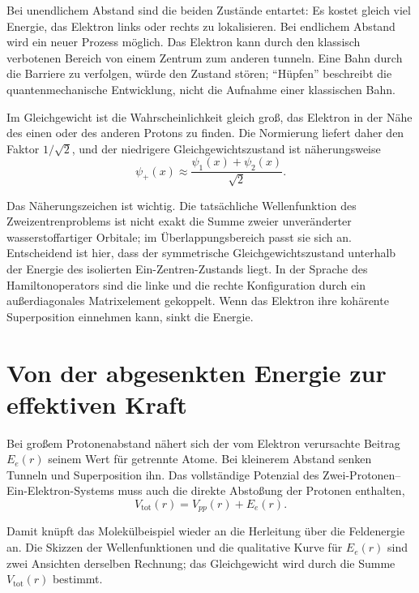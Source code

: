 Bei unendlichem Abstand sind die beiden Zustände entartet: Es kostet gleich viel Energie, das Elektron links oder rechts zu lokalisieren. Bei endlichem Abstand wird ein neuer Prozess möglich. Das Elektron kann durch den klassisch verbotenen Bereich von einem Zentrum zum anderen tunneln. Eine Bahn durch die Barriere zu verfolgen, würde den Zustand stören; ``Hüpfen'' beschreibt die quantenmechanische Entwicklung, nicht die Aufnahme einer klassischen Bahn.

Im Gleichgewicht ist die Wahrscheinlichkeit gleich groß, das Elektron in der Nähe des einen oder des anderen Protons zu finden. Die Normierung liefert daher den Faktor \(1/\sqrt2\), und der niedrigere Gleichgewichtszustand ist näherungsweise
\begin{equation}
\psi_+(x)\approx \frac{\psi_1(x)+\psi_2(x)}{\sqrt2}.
\end{equation}

Das Näherungszeichen ist wichtig. Die tatsächliche Wellenfunktion des Zweizentrenproblems ist nicht exakt die Summe zweier unveränderter wasserstoffartiger Orbitale; im Überlappungsbereich passt sie sich an. Entscheidend ist hier, dass der symmetrische Gleichgewichtszustand unterhalb der Energie des isolierten Ein-Zentren-Zustands liegt. In der Sprache des Hamiltonoperators sind die linke und die rechte Konfiguration durch ein außerdiagonales Matrixelement gekoppelt. Wenn das Elektron ihre kohärente Superposition einnehmen kann, sinkt die Energie.

\section{Von der abgesenkten Energie zur effektiven Kraft}

Bei großem Protonenabstand nähert sich der vom Elektron verursachte Beitrag \(E_e(r)\) seinem Wert für getrennte Atome. Bei kleinerem Abstand senken Tunneln und Superposition ihn. Das vollständige Potenzial des Zwei-Protonen--Ein-Elektron-Systems muss auch die direkte Abstoßung der Protonen enthalten,
\begin{equation}
V_{\mathrm{tot}}(r)=V_{pp}(r)+E_e(r).
\end{equation}

Damit knüpft das Molekülbeispiel wieder an die Herleitung über die Feldenergie an. Die Skizzen der Wellenfunktionen und die qualitative Kurve für \(E_e(r)\) sind zwei Ansichten derselben Rechnung; das Gleichgewicht wird durch die Summe \(V_{\mathrm{tot}}(r)\) bestimmt.

